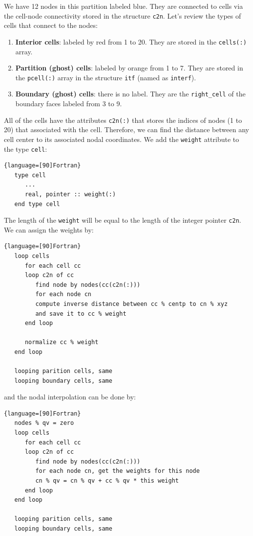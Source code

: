 \documentclass[12pt, letterpaper]{report}
\begin{document}
We have 12 nodes in this partition labeled blue. They are connected to cells via the cell-node
connectivity stored in the structure \verb+c2n+. Let's review the types of cells that connect to the
nodes:

\begin{enumerate}
   \item {\bf Interior cells}: labeled by red from 1 to 20. They are stored in the \verb+cells(:)+
      array.
   \item {\bf Partition (ghost) cells}: labeled by orange from 1 to 7. They are stored in the
      \verb+pcell(:)+ array in the structure \verb+itf+ (named as \verb+interf+).
   \item{\bf Boundary (ghost) cells}: there is no label. They are the \verb+right_cell+ of the
      boundary faces labeled from 3 to 9.
\end{enumerate}

All of the cells have the attributes \verb+c2n(:)+ that stores the indices of nodes (1 to 20) that
associated with the cell. Therefore, we can find the distance between any cell center to its
associated nodal coordinates. We add the \verb+weight+ attribute to the type \verb+cell+:

\begin{lstlisting}{language=[90]Fortran}
   type cell
      ...
      real, pointer :: weight(:)
   end type cell
\end{lstlisting}

The length of the \verb+weight+ will be equal to the length of the integer pointer \verb+c2n+. We
can assign the weights by:

\begin{lstlisting}{language=[90]Fortran}
   loop cells
      for each cell cc
      loop c2n of cc
         find node by nodes(cc(c2n(:)))
         for each node cn
         compute inverse distance between cc % centp to cn % xyz
         and save it to cc % weight
      end loop

      normalize cc % weight
   end loop

   looping parition cells, same
   looping boundary cells, same
\end{lstlisting}

and the nodal interpolation can be done by:

\begin{lstlisting}{language=[90]Fortran}
   nodes % qv = zero
   loop cells
      for each cell cc
      loop c2n of cc
         find node by nodes(cc(c2n(:)))
         for each node cn, get the weights for this node
         cn % qv = cn % qv + cc % qv * this weight 
      end loop
   end loop

   looping parition cells, same
   looping boundary cells, same
\end{lstlisting}
\end{document}
